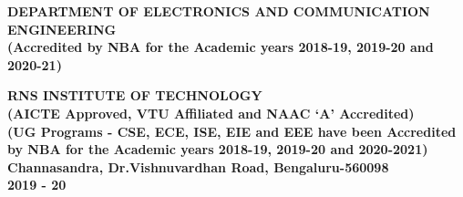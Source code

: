 \begin{titlingpage}
	\begin{center}
		\scriptsize\textbf{DEPARTMENT OF ELECTRONICS AND COMMUNICATION ENGINEERING}\\
		\small\textbf{(Accredited by NBA for the Academic years 2018-19, 2019-20 and 2020-21)}	
	\end{center}
	\begin{center}
		\vspace{0.1cm}
		\large\textbf{RNS INSTITUTE OF TECHNOLOGY}\\
		\small\textbf{(AICTE Approved, VTU Affiliated and NAAC `A' Accredited)\\
			(UG Programs - CSE, ECE, ISE, EIE and EEE have been Accredited by NBA for the Academic years 2018-19, 2019-20 and 2020-2021)\\
			Channasandra, Dr.Vishnuvardhan Road, Bengaluru-560098\\
			2019 - 20}
	\end{center}
	
\end{titlingpage}
